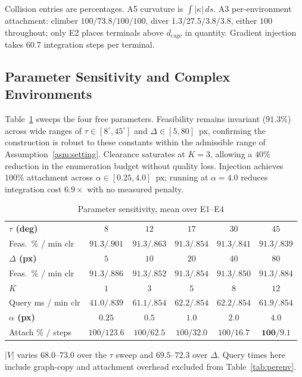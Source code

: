 \documentclass[conference]{IEEEtran}
\begin{document}
\begin{table}[htbp]
\vspace{-3pt}
\footnotesize Collision entries are percentages. A5 curvature is $\int|\kappa|\,ds$. A3 per-environment attachment: climber $100/73.8/100/100$, diver $1.3/\mathbf{27.5}/3.8/3.8$, either $100$ throughout; only E2 places terminals above $d_{\mathrm{cage}}$ in quantity. Gradient injection takes $60.7$ integration steps per terminal.
\end{table}

\subsection{Parameter Sensitivity and Complex Environments}

Table~\ref{tab:sweep} sweeps the four free parameters. Feasibility remains invariant ($91.3\%$) across wide ranges of $\tau\in[8^\circ,45^\circ]$ and $\Delta\in[5,80]$~px, confirming the construction is robust to these constants within the admissible range of Assumption~\ref{asm:setting}. Clearance saturates at $K=3$, allowing a $40\%$ reduction in the enumeration budget without quality loss. Injection achieves $100\%$ attachment across $\alpha\in[0.25,4.0]$~px; running at $\alpha=4.0$ reduces integration cost $6.9\times$ with no measured penalty.



\begin{table}[htbp]
\caption{Parameter sensitivity, mean over E1--E4}
\label{tab:sweep}

\setlength{\tabcolsep}{2pt}
\begin{tabular}{@{}lccccc@{}}
\toprule
\textbf{$\tau$ (deg)} & $8$ & $12$ & $17$ & $30$ & $45$ \\
Feas.\ \% / min clr & $91.3/.901$ & $91.3/.863$ & $91.3/.854$ & $91.3/.841$ & $91.3/.839$ \\ \midrule
\textbf{$\Delta$ (px)} & $5$ & $10$ & $20$ & $40$ & $80$ \\
Feas.\ \% / min clr & $91.3/.886$ & $91.3/.852$ & $91.3/.854$ & $91.3/.850$ & $91.3/.884$ \\ \midrule
\textbf{$K$} & $1$ & $3$ & $5$ & $8$ & $12$ \\
Query ms / min clr & $41.0/.839$ & $61.1/.854$ & $62.2/.854$ & $62.2/.854$ & $61.9/.854$ \\ \midrule
\textbf{$\alpha$ (px)} & $0.25$ & $0.5$ & $1.0$ & $2.0$ & $4.0$ \\
Attach \% / steps & $100/123.6$ & $100/62.5$ & $100/32.0$ & $100/16.7$ & $\mathbf{100/9.1}$ \\ \bottomrule
\end{tabular}

\vspace{3pt}
\footnotesize $|V|$ varies $68.0$--$73.0$ over the $\tau$ sweep and $69.5$--$72.3$ over $\Delta$. Query times here include graph-copy and attachment overhead excluded from Table~\ref{tab:perenv}.
\end{table}
\end{document}
